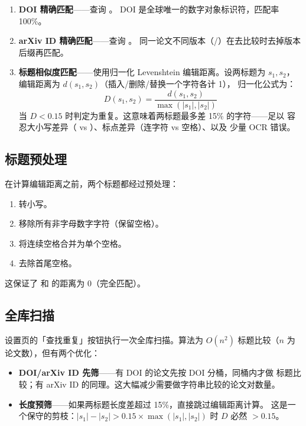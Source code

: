 \begin{enumerate}
  \item \textbf{DOI 精确匹配}——查询 。
    DOI 是全球唯一的数字对象标识符，匹配率 100\%。
  \item \textbf{arXiv ID 精确匹配}——查询 。
    同一论文不同版本（/）在去比较时去掉版本后缀再匹配。
  \item \textbf{标题相似度匹配}——使用归一化 Levenshtein 编辑距离。设两标题为
    $s_1, s_2$，编辑距离为 $d(s_1, s_2)$（插入/删除/替换一个字符各计 1），
    归一化公式为：
    \[
      D(s_1, s_2) = \frac{d(s_1, s_2)}{\max(|s_1|, |s_2|)}
    \]
    当 $D < 0.15$ 时判定为重复。这意味着两标题最多差 15\% 的字符——足以
    容忍大小写差异（ vs
    ）、标点差异（连字符 vs 空格）、以及
    少量 OCR 错误。
\end{enumerate}

\subsection{标题预处理}

在计算编辑距离之前，两个标题都经过预处理：

\begin{enumerate}
  \item 转小写。
  \item 移除所有非字母数字字符（保留空格）。
  \item 将连续空格合并为单个空格。
  \item 去除首尾空格。
\end{enumerate}

这保证了  和
 的距离为 0（完全匹配）。

\subsection{全库扫描}

设置页的「查找重复」按钮执行一次全库扫描。算法为 $O(n^2)$ 标题比较（$n$ 为
论文数），但有两个优化：

\begin{itemize}
  \item \textbf{DOI/arXiv ID 先筛}——有 DOI 的论文先按 DOI 分桶，同桶内才做
    标题比较；有 arXiv ID 的同理。这大幅减少需要做字符串比较的论文对数量。
  \item \textbf{长度预筛}——如果两标题长度差超过 15\%，直接跳过编辑距离计算。
    这是一个保守的剪枝：$|s_1| - |s_2| > 0.15 \times \max(|s_1|, |s_2|)$
    时 $D$ 必然 $> 0.15$。
\end{itemize}

